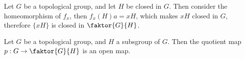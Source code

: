 \begin{example}\label{2.11}
    Let $G$ be a topological group, and let $H$ be closed in $G$. Then consider
    the homeomorphism of $f_x$, then $f_x(H)a=xH$, which makes $xH$ closed in
    $G$, therefore  $\{xH\}$ is closed in $\faktor{G}{H}$.
\end{example}

\begin{lemma}\label{2.5.8}
    Let $G$ be a topological group, and  $H$ a subsgroup of  $G$. Then the
    quotient map  $p:G \rightarrow \faktor{G}{H}$ is an open map.
\end{lemma}
